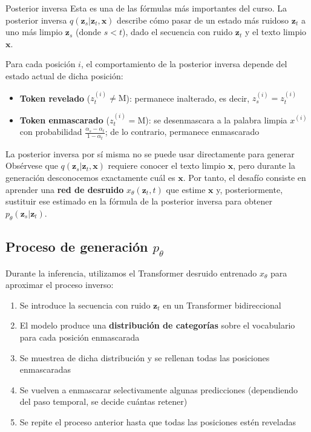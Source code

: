 \documentclass[a4paper]{article}
\begin{document}
\begin{importantbox}{Posterior inversa}
Esta es una de las fórmulas más importantes del curso. La posterior inversa $q(\mathbf{z}_s | \mathbf{z}_t, \mathbf{x})$ describe cómo pasar de un estado más ruidoso $\mathbf{z}_t$ a uno más limpio $\mathbf{z}_s$ (donde $s < t$), dado el secuencia con ruido $\mathbf{z}_t$ y el texto limpio $\mathbf{x}$.
\end{importantbox}

Para cada posición $i$, el comportamiento de la posterior inversa depende del estado actual de dicha posición:
\begin{itemize}
    \item \textbf{Token revelado} ($z_t^{(i)} \neq \text{M}$): permanece inalterado, es decir, $z_s^{(i)} = z_t^{(i)}$
    \item \textbf{Token enmascarado} ($z_t^{(i)} = \text{M}$): se desenmascara a la palabra limpia $x^{(i)}$ con probabilidad $\frac{\alpha_s - \alpha_t}{1 - \alpha_t}$; de lo contrario, permanece enmascarado
\end{itemize}

\begin{warningbox}{La posterior inversa por sí misma no se puede usar directamente para generar}
Obsérvese que $q(\mathbf{z}_s | \mathbf{z}_t, \mathbf{x})$ requiere conocer el texto limpio $\mathbf{x}$, pero durante la generación desconocemos exactamente cuál es $\mathbf{x}$. Por tanto, el desafío consiste en aprender una \textbf{red de desruido} $x_\theta(\mathbf{z}_t, t)$ que estime $\mathbf{x}$ y, posteriormente, sustituir ese estimado en la fórmula de la posterior inversa para obtener $p_\theta(\mathbf{z}_s | \mathbf{z}_t)$.
\end{warningbox}

\subsection{Proceso de generación $p_\theta$}

Durante la inferencia, utilizamos el Transformer desruido entrenado $x_\theta$ para aproximar el proceso inverso:

\begin{enumerate}
    \item Se introduce la secuencia con ruido $\mathbf{z}_t$ en un Transformer bidireccional
    \item El modelo produce una \textbf{distribución de categorías} sobre el vocabulario para cada posición enmascarada
    \item Se muestrea de dicha distribución y se rellenan todas las posiciones enmascaradas
    \item Se vuelven a enmascarar selectivamente algunas predicciones (dependiendo del paso temporal, se decide cuántas retener)
    \item Se repite el proceso anterior hasta que todas las posiciones estén reveladas
\end{enumerate}
\end{document}
